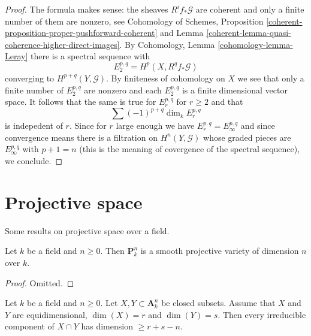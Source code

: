 \begin{proof}
The formula makes sense: the sheaves $R^if_*\mathcal{G}$ are coherent
and only a finite number of them are nonzero, see
Cohomology of Schemes,
Proposition \ref{coherent-proposition-proper-pushforward-coherent} and
Lemma \ref{coherent-lemma-quasi-coherence-higher-direct-images}.
By Cohomology, Lemma \ref{cohomology-lemma-Leray} there is a spectral
sequence with
$$
E_2^{p, q} = H^p(X, R^qf_*\mathcal{G})
$$
converging to $H^{p + q}(Y, \mathcal{G})$. By finiteness of cohomology
on $X$ we see that only a finite number of $E_2^{p, q}$ are nonzero
and each $E_2^{p, q}$ is a finite dimensional vector space. It follows
that the same is true for $E_r^{p, q}$ for $r \geq 2$ and that
$$
\sum (-1)^{p + q} \dim_k E_r^{p, q}
$$
is indepedent of $r$. Since for $r$ large enough we have
$E_r^{p, q} = E_\infty^{p, q}$ and since convergence means there
is a filtration on $H^n(Y, \mathcal{G})$ whose graded pieces are
$E_\infty^{p, q}$ with $p + 1 = n$ (this is the meaning of covergence
of the spectral sequence), we conclude.
\end{proof}







\section{Projective space}
\label{section-projective-space}

\noindent
Some results on projective space over a field.

\begin{lemma}
\label{lemma-projective-space-smooth}
Let $k$ be a field and $n \geq 0$. Then $\mathbf{P}^n_k$ is a
smooth projective variety of dimension $n$ over $k$.
\end{lemma}

\begin{proof}
Omitted.
\end{proof}

\begin{lemma}
\label{lemma-intersection-in-affine-space}
Let $k$ be a field and $n \geq 0$. Let $X, Y \subset \mathbf{A}^n_k$
be closed subsets. Assume that $X$ and $Y$ are equidimensional,
$\dim(X) = r$ and $\dim(Y) = s$.
Then every irreducible component of $X \cap Y$ has dimension $\geq r + s - n$.
\end{lemma}

